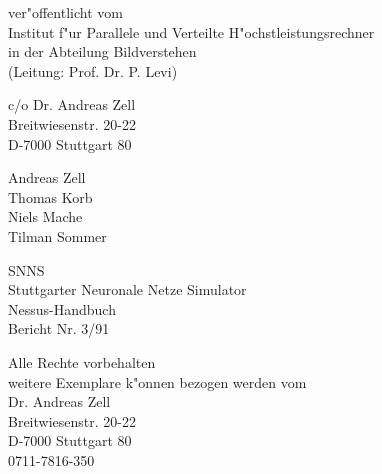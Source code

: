 \begin{titlepage}
\begin{center}
\vspace{5cm}
	ver"offentlicht vom\\
	Institut f"ur Parallele und Verteilte H"ochstleistungsrechner\\
	in der Abteilung Bildverstehen\\
	(Leitung: Prof. Dr. P. Levi)\\

\vspace{0.5cm}

	c/o Dr. Andreas Zell\\
	Breitwiesenstr. 20-22\\
	D-7000 Stuttgart 80\\

\vspace{4.5cm}

	{\Large Andreas Zell}\\
	{\Large Thomas Korb}\\
	{\Large Niels Mache}\\
	{\Large Tilman Sommer}\\

\vspace{2.5cm}

       {\Huge SNNS}\\[0.2cm]
	Stuttgarter Neuronale Netze Simulator\\[0.5cm]
       {\LARGE Nessus-Handbuch}\\[0.5cm]
	Bericht Nr. 3/91\\

\vspace{2.5cm}

	Alle Rechte vorbehalten\\[0.5cm]
	weitere Exemplare k"onnen bezogen werden vom\\
	Dr. Andreas Zell\\
	Breitwiesenstr. 20-22\\
	D-7000 Stuttgart 80\\
	0711-7816-350\\
\end{center}
\end{titlepage}
